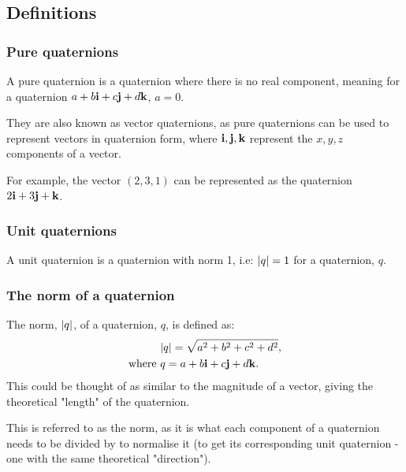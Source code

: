 \documentclass[11pt]{article}
\begin{document}
\subsection{Definitions}

\subsubsection{Pure quaternions} \label{PureDef}

A pure quaternion is a quaternion where there is no real component, meaning for a quaternion $a + b\vb{i} + c\vb{j} + d\vb{k}$, $a = 0$. \cite{Math431}

They are also known as vector quaternions, as pure quaternions can be used to represent vectors in quaternion form, where $\vb{i, j, k}$ represent the $x, y, z$ components of a vector.

For example, the vector $(2,3,1)$ can be represented as the quaternion $2\vb{i} + 3\vb{j} + \vb{k}$.

\subsubsection{Unit quaternions}

A unit quaternion is a quaternion with norm 1, i.e: $\abs{q} = 1$ for a quaternion, $q$. \cite{DRose}

\subsubsection{The norm of a quaternion}

The norm, $\abs{q}$, of a quaternion, $q$, is defined as:
\begin{equation}
    \begin{aligned}
        &\abs{q} = \sqrt{a^2 + b^2 + c^2 + d^2}, \\
        \text{where } & q = a + b\vb{i} + c\vb{j} + d\vb{k}.
    \end{aligned} 
\end{equation}
This could be thought of as similar to the magnitude of a vector, giving the theoretical "length" of the quaternion. \cite{Math431}

This is referred to as the norm, as it is what each component of a quaternion needs to be divided by to normalise it (to get its corresponding unit quaternion - one with the same theoretical "direction").
\end{document}

